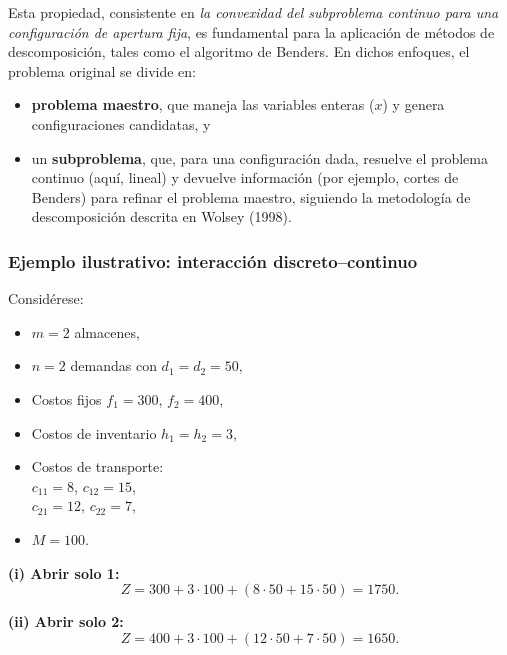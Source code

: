 \documentclass[
  spanish,
  us-letterpaper,
]{scrreprt}
\providecommand{\tightlist}{%
  \setlength{\itemsep}{0pt}\setlength{\parskip}{0pt}}
\numberwithin{equation}{section}
\begin{document}
Esta propiedad, consistente en \emph{la convexidad del subproblema
continuo para una configuración de apertura fija}, es fundamental para
la aplicación de métodos de descomposición, tales como el algoritmo de
Benders. En dichos enfoques, el problema original se divide en:

\begin{itemize}
\tightlist
\item
  \textbf{problema maestro}, que maneja las variables enteras (\(x\)) y
  genera configuraciones candidatas, y
\item
  un \textbf{subproblema}, que, para una configuración dada, resuelve el
  problema continuo (aquí, lineal) y devuelve información (por ejemplo,
  cortes de Benders) para refinar el problema maestro, siguiendo la
  metodología de descomposición descrita en Wolsey (1998).
\end{itemize}

\subsubsection{Ejemplo ilustrativo: interacción
discreto--continuo}\label{ejemplo-ilustrativo-interacciuxf3n-discretocontinuo}

Considérese:

\begin{itemize}
\tightlist
\item
  \(m=2\) almacenes,\\
\item
  \(n=2\) demandas con \(d_1=d_2=50\),\\
\item
  Costos fijos \(f_1=300\), \(f_2=400\),\\
\item
  Costos de inventario \(h_1=h_2=3\),\\
\item
  Costos de transporte:\\
  \(c_{11}=8\), \(c_{12}=15\),\\
  \(c_{21}=12\), \(c_{22}=7\),\\
\item
  \(M=100\).
\end{itemize}

\textbf{(i) Abrir solo 1:}\\
\[
Z = 300 + 3\cdot 100 + (8\cdot 50 + 15\cdot 50)=1750.
\]

\textbf{(ii) Abrir solo 2:}\\
\[
Z = 400 + 3\cdot 100 + (12\cdot 50 + 7\cdot 50)=1650.
\]
\end{document}
